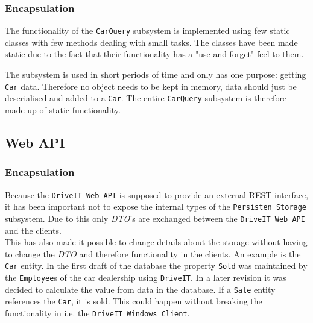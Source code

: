 \subsubsection{Encapsulation}
The functionality of the \texttt{CarQuery} subsystem is implemented using few static classes with few methods dealing with small tasks. The classes have been made static due to the fact that their functionality has a "use and forget"-feel to them. 

The subsystem is used in short periods of time and only has one purpose: getting \texttt{Car} data. Therefore no object needs to be kept in memory, data should just be deserialised and added to a \texttt{Car}. The entire \texttt{CarQuery} subsystem is therefore made up of static functionality.

\subsection{Web API}
\subsubsection{Encapsulation}
Because the \texttt{DriveIT Web API} is supposed to provide an external REST-interface, it has been important not to expose the internal types of the \texttt{Persisten Storage} subsystem. Due to this only \textit{DTO}'s are exchanged between the \texttt{DriveIT Web API} and the clients.\\

This has also made it possible to change details about the storage without having to change the \textit{DTO} and therefore functionality in the clients. An example is the \texttt{Car} entity. In the first draft of the database the property \texttt{Sold} was maintained by the \texttt{Employee}s of the car dealership using \texttt{DriveIT}. In a later revision it was decided to calculate the value from data in the database. If a \texttt{Sale} entity references the \texttt{Car}, it is sold. This could happen without breaking the functionality in i.e. the \texttt{DriveIT Windows Client}.

